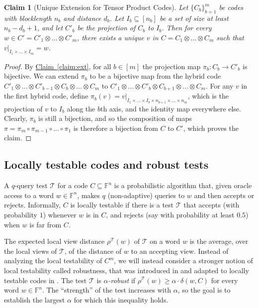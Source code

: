 \documentclass[11pt]{article}
\numberwithin{equation}{section}
\newtheorem{claim}[theorem]{Claim}
\theoremstyle{definition}
\theoremstyle{plain}
\newcommand{\expref}[2]{\hyperref[#2]{#1~\ref{#2}}}
\theoremstyle{plain}
\newcommand{\colored}{}
\newcommand{\reldist}{\colored{\delta}}
\newcommand{\robust}{\colored{\rho}} %
\newcommand{\codedist}{\colored{d}} %
\newcommand{\blocklength}{\colored{n}} %
\newcommand{\arbtester}{\colored{\mathcal T}}
\newcommand{\Field}{\colored{\mathbb F}}
\newcommand{\word}{\colored{w}}
\newcommand{\otherword}{\colored{v}}
\begin{document}
\begin{claim}[Unique Extension for Tensor Product Codes]
\label{claim:tensorext}
Let $\{C_b\}_{b = 1}^{m}$ be codes with blocklength $\blocklength_b$ and distance $\codedist_b$. Let $I_b \subseteq [\blocklength_b]$ be a set of size at least $\blocklength_b - \codedist_b + 1$, and let $C'_b$ be the projection of $C_b$ to $I_b$. Then for every $\word \in C' =  C'_1 \otimes \dots \otimes C'_m$, there exists a unique $\otherword$ in $C = C_1 \otimes \dots \otimes C_m$ such that $\otherword \vert_{I_1 \times \dots \times I_m} = \word$.
\end{claim}

\begin{proof}
By \expref{Claim}{claim:ext}, for all $b \in[m]$ the projection map $\pi_b \colon C_b \to C'_b$ is bijective. We can extend $\pi_b$ to be a bijective map from the hybrid code $C'_1 \otimes \dots \otimes C'_{b-1} \otimes C_b \otimes \dots \otimes C_m$ to $C'_1 \otimes \dots \otimes C'_{b} \otimes C_{b+1} \otimes \dots \otimes C_m$. For any $\otherword$ in the first hybrid code, define $\pi_b(\otherword) = \otherword \vert_{I_1 \times \dots \times I_b \times \blocklength_{b+1} \times \dots \times \blocklength_m}$, which is the projection of $\otherword$ to $I_b$ along the $b$th axis, and the identity map everywhere else. Clearly, $\pi_b$ is still a bijection, and so the composition of maps $\pi = \pi_m \circ \pi_{m-1} \circ \dots \circ \pi_1$ is therefore a bijection from $C$ to $C'$, which proves the claim.
\end{proof}



%
%
\subsection{Locally testable codes and robust tests}
\label{sec:ltc}

A $q$-query test $\arbtester$ for a code $C \subseteq \Field^{\blocklength}$ is a probabilistic algorithm that, given oracle access to a word $\word \in \Field^{\blocklength}$, makes $q$ (non-adaptive) queries to $\word$ and then accepts or rejects. Informally, $C$ is locally testable if there is a test $\arbtester$ that accepts (with probability $1$) whenever $\word$ is in $C$, and rejects (say with probability at least $0.5$) when $\word$ is far from $C$.

The expected local view distance $\robust^{\arbtester}(\word)$ of $\arbtester$ on a word $\word$ is the average, over the local views of $\arbtester$, of the distance of $\word$ to an accepting view. Instead of analyzing the local testability of $C^m$, we will instead consider a stronger notion of local testability called robustness, that was introduced in \cite{BenSassonGHSV06} and adapted to locally  testable codes in \cite{Ben-SassonS06}. The test $\arbtester$ is \emph{$\alpha$-robust} if $\robust^{\arbtester}(\word) \geq \alpha \cdot \reldist(\word, C)$ for every word $\word \in \Field^{\blocklength}$. The ``strength'' of the test increases with $\alpha$, so the goal is to establish the largest $\alpha$ for which this inequality holds.
\end{document}
